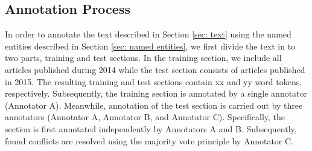 \documentclass[11pt]{article}
\begin{document}







\subsection{Annotation Process}

In order to annotate the text described in Section \ref{sec: text} using the named entities described in Section \ref{sec: named entities}, we first divide the text in to two parts, training and test sections. In the training section, we include all articles published during 2014 while the test section consists of articles published in 2015. The resulting training and test sections contain xx and yy word tokens, respectively. Subsequently, the training section is annotated by a single annotator (Annotator A). Meanwhile, annotation of the test section is carried out by three annotators (Annotator A, Annotator B, and Annotator C). Specifically, the section is first annotated independently by Annotators A and B. Subsequently, found conflicts are resolved using the majority vote principle by Annotator C.
\end{document}
